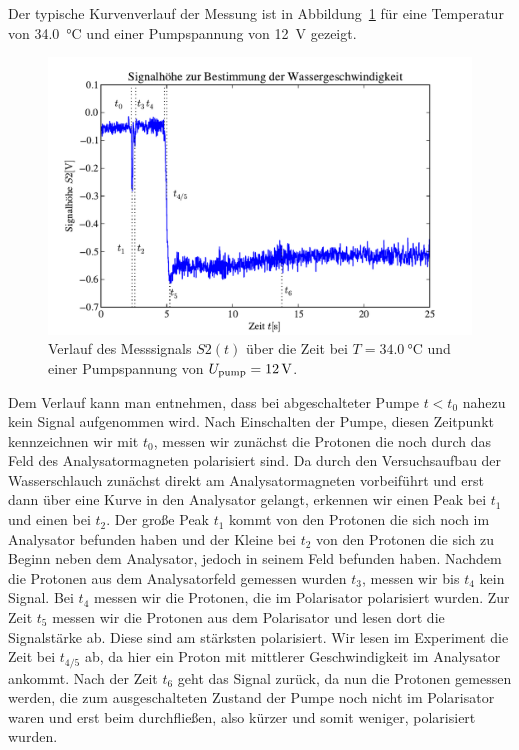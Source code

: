 \documentclass[paper=a4,
	fontsize=10pt,
	DIV=18,
	twocolumn,
	parskip=half
	]{scrartcl}
\numberwithin{equation}{section}    %
\begin{document}
Der typische Kurvenverlauf der Messung ist in Abbildung~\ref{fig.wassergeschwindigkeit} für eine Temperatur von \SI{34.0}{\celsius} und einer Pumpspannung von \SI{12}{\volt} gezeigt.

\begin{figure}[htp]
	\begin{center}
		\includegraphics[width=\columnwidth]{Data-Plots/06-wassergeschwindigkeit.pdf}
		\caption{Verlauf des Messsignals $S2(t)$ über die Zeit bei $T=\SI{34.0}{\celsius}$ und einer Pumpspannung von $U_{\rm pump}=\SI{12}{\volt}$.}
		\label{fig.wassergeschwindigkeit}
	\end{center}
\end{figure}

Dem Verlauf kann man entnehmen, dass bei abgeschalteter Pumpe $t<t_0$ nahezu kein Signal aufgenommen wird. Nach Einschalten der Pumpe, diesen Zeitpunkt kennzeichnen wir mit $t_0$, messen wir zunächst die Protonen die noch durch das Feld des Analysatormagneten polarisiert sind. Da durch den Versuchsaufbau der Wasserschlauch zunächst direkt am Analysatormagneten vorbeiführt und erst dann über eine Kurve in den Analysator gelangt, erkennen wir einen Peak bei $t_1$ und einen bei $t_2$. Der große Peak $t_1$ kommt von den Protonen die sich noch im Analysator befunden haben und der Kleine bei $t_2$ von den Protonen die sich zu Beginn neben dem Analysator, jedoch in seinem Feld befunden haben. Nachdem die Protonen aus dem Analysatorfeld gemessen wurden $t_3$, messen wir bis $t_4$ kein Signal. Bei $t_4$ messen wir die Protonen, die im Polarisator polarisiert wurden. Zur Zeit $t_5$ messen wir die Protonen aus dem Polarisator und lesen dort die Signalstärke ab. Diese sind am stärksten polarisiert. Wir lesen im Experiment die Zeit bei $t_{4/5}$ ab, da hier ein Proton mit mittlerer Geschwindigkeit im Analysator ankommt. Nach der Zeit $t_6$ geht das Signal zurück, da nun die Protonen gemessen werden, die zum ausgeschalteten Zustand der Pumpe noch nicht im Polarisator waren und erst beim durchfließen, also kürzer und somit weniger, polarisiert wurden.
\end{document}
